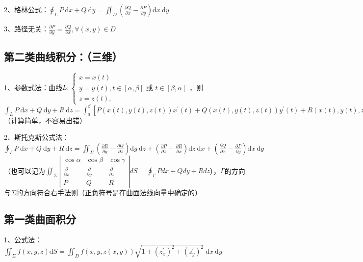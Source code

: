 2、格林公式：$ \oint_{L} P \mathrm{~d} x+Q \mathrm{~d} y=\iint_{D}\left(\frac{\partial Q}{\partial x}-\frac{\partial P}{\partial y}\right) \mathrm{d} x \mathrm{~d} y $

3、路径无关：$ \frac{\partial P}{\partial y}=\frac{\partial Q}{\partial x}, \forall(x, y) \in D $



\subsection{第二类曲线积分：（三维）}

1、参数式法：曲线$ L:\left\{\begin{array}{l}x=x(t) \\ y=y(t), t \in[\alpha, \beta] \text { 或 } t \in[\beta, \alpha]\\ z=z(t),\end{array}\right. $，则$ \int_{L} P \mathrm{~d} x+Q \mathrm{~d} y+R \mathrm{~d} z= \int_{a}^{\beta}\left[P(x(t), y(t), z(t)) x^{\prime}(t)+Q(x(t), y(t), z(t)) y^{\prime}(t)+R(x(t), y(t), z(t)) z^{\prime}(t)\right] \mathrm{d} t $（计算简单，不容易出错）

2、斯托克斯公式法：$ \oint_{\Gamma} P \mathrm{~d} x+Q \mathrm{~d} y+R \mathrm{~d} z=\iint_{\Sigma}\left(\frac{\partial R}{\partial y}-\frac{\partial Q}{\partial z}\right) \mathrm{d} y \mathrm{~d} z+\left(\frac{\partial P}{\partial z}-\frac{\partial R}{\partial x}\right) \mathrm{d} z \mathrm{~d} x+\left(\frac{\partial Q}{\partial x}-\frac{\partial P}{\partial y}\right) \mathrm{d} x \mathrm{~d} y $（也可以记为$ \iint_{\Sigma}\left|\begin{array}{ccc}\cos \alpha & \cos \beta & \cos \gamma \\\frac{\partial}{\partial x} & \frac{\partial}{\partial y} & \frac{\partial}{\partial z} \\P & Q & R\end{array}\right| d S=\oint_{\Gamma} P d x+Q d y+R d z $），$ \Gamma $的方向与$ \Sigma $的方向符合右手法则（正负符号是在曲面法线向量中确定的）



\subsection{第一类曲面积分}

1、公式法：$ \iint_{\Sigma} f(x, y, z) \mathrm{d} S=\iint_{D} f(x, y, z(x, y)) \sqrt{1+\left(z_{x}^{\prime}\right)^{2}+\left(z_{y}^{\prime}\right)^{2}} \mathrm{~d} x \mathrm{~d} y $



